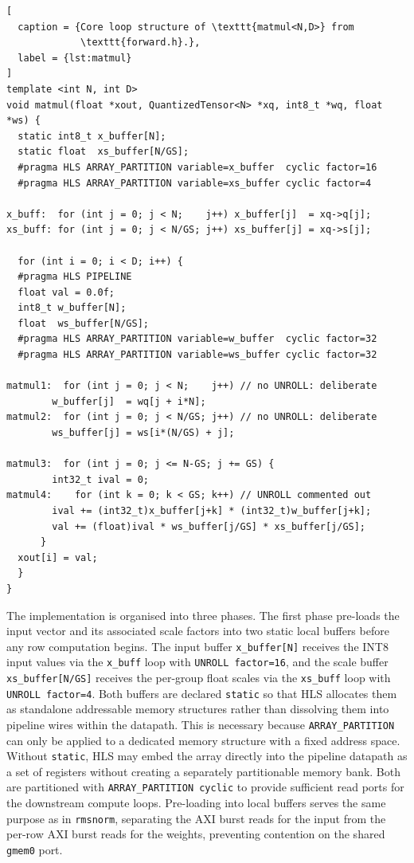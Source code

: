 \begin{lstlisting}[
  caption = {Core loop structure of \texttt{matmul<N,D>} from
             \texttt{forward.h}.},
  label = {lst:matmul}
]
template <int N, int D>
void matmul(float *xout, QuantizedTensor<N> *xq, int8_t *wq, float *ws) {
  static int8_t x_buffer[N];
  static float  xs_buffer[N/GS];
  #pragma HLS ARRAY_PARTITION variable=x_buffer  cyclic factor=16
  #pragma HLS ARRAY_PARTITION variable=xs_buffer cyclic factor=4

x_buff:  for (int j = 0; j < N;    j++) x_buffer[j]  = xq->q[j];
xs_buff: for (int j = 0; j < N/GS; j++) xs_buffer[j] = xq->s[j];

  for (int i = 0; i < D; i++) {
  #pragma HLS PIPELINE
  float val = 0.0f;
  int8_t w_buffer[N];
  float  ws_buffer[N/GS];
  #pragma HLS ARRAY_PARTITION variable=w_buffer  cyclic factor=32
  #pragma HLS ARRAY_PARTITION variable=ws_buffer cyclic factor=32

matmul1:  for (int j = 0; j < N;    j++) // no UNROLL: deliberate
        w_buffer[j]  = wq[j + i*N];
matmul2:  for (int j = 0; j < N/GS; j++) // no UNROLL: deliberate
        ws_buffer[j] = ws[i*(N/GS) + j];

matmul3:  for (int j = 0; j <= N-GS; j += GS) {
        int32_t ival = 0;
matmul4:    for (int k = 0; k < GS; k++) // UNROLL commented out
        ival += (int32_t)x_buffer[j+k] * (int32_t)w_buffer[j+k];
        val += (float)ival * ws_buffer[j/GS] * xs_buffer[j/GS];
      }
  xout[i] = val;
  }
}
\end{lstlisting}

The implementation is organised into three phases. The first phase
pre-loads the input vector and its associated scale factors into two
static local buffers before any row computation begins. The input buffer
\texttt{x\_buffer[N]} receives the INT8 input values via the
\texttt{x\_buff} loop with \texttt{UNROLL factor=16}, and the scale buffer
\texttt{xs\_buffer[N/GS]} receives the per-group float scales via the
\texttt{xs\_buff} loop with \texttt{UNROLL factor=4}. Both buffers are declared \texttt{static} so that HLS allocates them
as standalone addressable memory structures rather than dissolving them
into pipeline wires within the datapath. This is necessary because
\texttt{ARRAY\_PARTITION} can only be applied to a dedicated memory
structure with a fixed address space. Without \texttt{static}, HLS may
embed the array directly into the pipeline datapath as a set of
registers without creating a separately partitionable memory bank.
Both are partitioned with
\texttt{ARRAY\_PARTITION cyclic} to provide sufficient read ports for the
downstream compute loops. Pre-loading into local buffers serves the same
purpose as in \texttt{rmsnorm}, separating the AXI burst reads for the
input from the per-row AXI burst reads for the weights, preventing
contention on the shared \texttt{gmem0} port.


